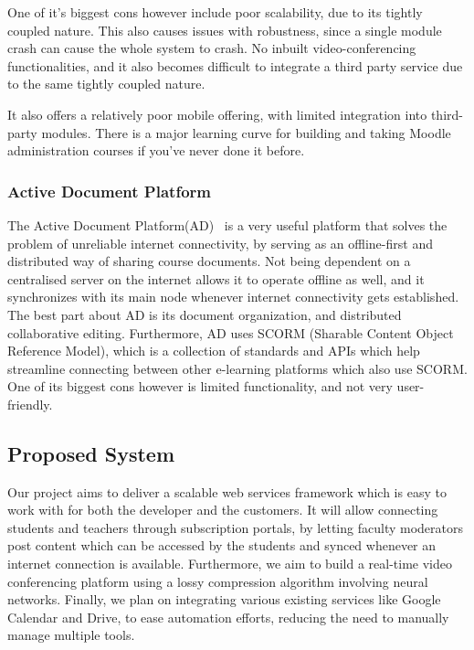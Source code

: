 One of it’s biggest cons however include poor scalability, due to its tightly coupled nature. 
This also causes issues with robustness, since a single module crash can cause the whole system to crash. 
No inbuilt video-conferencing functionalities, and it also becomes difficult to integrate a 
third party service due to the same tightly coupled nature.

It also offers a relatively poor mobile offering, with limited integration into third-party modules. 
There is a major learning curve for building and taking Moodle administration courses if you've never done it before.

\subsubsection{Active Document Platform}
The Active Document Platform(AD)~\cite{ActiveDocument} is a very useful platform that 
solves the problem of unreliable internet connectivity, by serving as an offline-first 
and distributed way of sharing course documents. Not being dependent on a centralised 
server on the internet allows it to operate offline as well, and it synchronizes with 
its main node whenever internet connectivity gets established. The best part about AD 
is its document organization, and distributed collaborative editing. Furthermore, AD 
uses SCORM (Sharable Content Object Reference Model), which is a collection of standards 
and APIs which help streamline connecting between other e-learning platforms which also 
use SCORM. One of its biggest cons however is limited functionality, and not very user-friendly.

\subsection{Proposed System}

Our project aims to deliver a scalable web services framework which is easy to work with 
for both the developer and the customers. It will allow connecting students and teachers 
through subscription portals, by letting faculty moderators post content which can be accessed 
by the students and synced whenever an internet connection is available. 
Furthermore, we aim to build a real-time video conferencing platform using a lossy compression 
algorithm involving neural networks. 
Finally, we plan on integrating various existing services like Google Calendar and Drive, 
to ease automation efforts, reducing the need to manually manage multiple tools.

